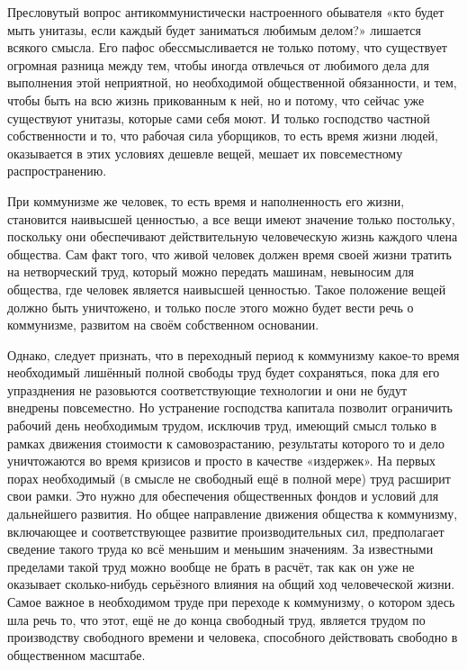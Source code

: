 \documentclass[12pt,a4paper,openany]{book}
\begin{document}
Пресловутый вопрос антикоммунистически настроенного обывателя «кто будет мыть унитазы, если каждый будет заниматься любимым делом?» лишается всякого смысла. Его пафос обессмысливается не только потому, что существует огромная разница между тем, чтобы иногда отвлечься от любимого дела для выполнения этой неприятной, но необходимой общественной обязанности, и тем, чтобы быть на всю жизнь прикованным к ней, но и потому, что сейчас уже существуют унитазы, которые сами себя моют. И только господство частной собственности и то, что рабочая сила уборщиков, то есть время жизни людей, оказывается в этих условиях дешевле вещей, мешает их повсеместному распространению.

При коммунизме же человек, то есть время и наполненность его жизни, становится наивысшей ценностью, а все вещи имеют значение только постольку, поскольку они обеспечивают действительную человеческую жизнь каждого члена общества. Сам факт того, что живой человек должен время своей жизни тратить на нетворческий труд, который можно передать машинам, невыносим для общества, где человек является наивысшей ценностью. Такое положение вещей должно быть уничтожено, и только после этого можно будет вести речь о коммунизме, развитом на своём собственном основании.

Однако, следует признать, что в переходный период к коммунизму какое-то время необходимый лишённый полной свободы труд будет сохраняться, пока для его упразднения не разовьются соответствующие технологии и они не будут внедрены повсеместно. Но устранение господства капитала позволит ограничить рабочий день необходимым трудом, исключив труд, имеющий смысл только в рамках движения стоимости к самовозрастанию, результаты которого то и дело уничтожаются во время кризисов и просто в качестве «издержек». На первых порах необходимый (в смысле не свободный ещё в полной мере) труд расширит свои рамки. Это нужно для обеспечения общественных фондов и условий для дальнейшего развития. Но общее направление движения общества к коммунизму, включающее и соответствующее развитие производительных сил, предполагает сведение такого труда ко всё меньшим и меньшим значениям. За известными пределами такой труд можно вообще не брать в расчёт, так как он уже не оказывает сколько-нибудь серьёзного влияния на общий ход человеческой жизни. Самое важное в необходимом труде при переходе к коммунизму, о котором здесь шла речь то, что этот, ещё не до конца свободный труд, является трудом по производству свободного времени и человека, способного действовать свободно в общественном масштабе.
\ifSubfilesClassLoaded{\setcounter{page}{40}}{}
\end{document}
